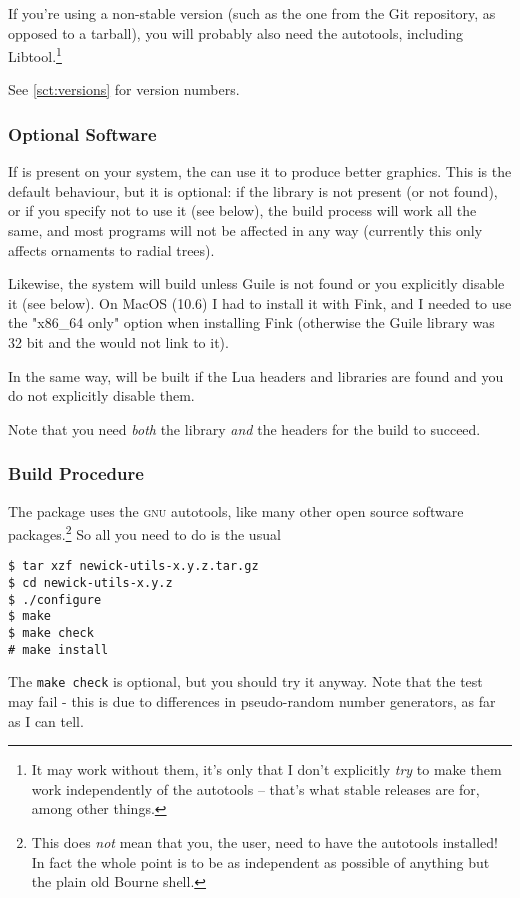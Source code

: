 If you're using a non-stable version (such as the one from the Git repository,
as opposed to a tarball), you will probably also need the \gnu{} autotools,
including Libtool.\footnote{It may work without them, it's only that I don't
explicitly \emph{try} to make them work independently of the autotools -- that's
what stable releases are for, among other things.}

See \ref{sct:versions} for version numbers.

\subsubsection{Optional Software}
\label{sct:optional}

\noindent{}If \libxml{} is present on your system, the \nutils{} can use it to
produce better \svg{} graphics. This is the default behaviour, but it is
optional: if the library is not present (or not found), or if you specify not to
use it (see below), the build process will work all the same, and most programs
will not be affected in any way (currently this only affects ornaments to
radial \svg{} trees).

Likewise, the system will build \sched{} unless Guile is not found or you
explicitly disable it (see below). On MacOS (10.6) I had to install it with
Fink, and I needed to use the "x86\_64 only" option when installing Fink
(otherwise the Guile library was 32 bit and the \nutils{} would not link to it).

In the same way, \luaed{} will be built if the Lua headers and libraries are
found and you do not explicitly disable them.

Note that you need \emph{both} the library \emph{and} the headers for the build
to succeed.

\subsubsection{Build Procedure}
\noindent{}The package uses the \textsc{gnu} autotools, like many other open source software packages.\footnote{This does \emph{not} mean that you, the user, need to have the autotools installed! In fact the whole point is to be as independent as possible of anything but the plain old Bourne shell.} So all you need to do is the usual
\begin{verbatim}
$ tar xzf newick-utils-x.y.z.tar.gz
$ cd newick-utils-x.y.z
$ ./configure
$ make
$ make check
# make install
\end{verbatim}
The \texttt{make check} is optional, but you should try it anyway. Note that
the \gen{} test may fail - this is due to differences in pseudo-random number
generators, as far as I can tell.

